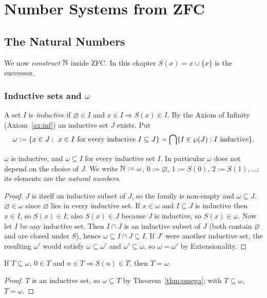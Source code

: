 \part{Number Systems from ZFC}

\chapter{The Natural Numbers}\label{ch:nat}

We now \emph{construct} $\mathbb{N}$ inside ZFC. In this chapter $S(x)=x\cup\{x\}$ is the successor.

\section{Inductive sets and $\omega$}

\begin{definition}
	A set $I$ is \emph{inductive} if $\varnothing\in I$ and $x\in I\Rightarrow S(x)\in I$. By the Axiom of Infinity (Axiom~\ref{ax:inf}) an inductive set $J$ exists. Put
	\[
	\omega:=\{x\in J:\ x\in I\text{ for every inductive }I\subseteq J\}=\bigcap\{I\in\wp(J):I\text{ inductive}\}.
	\]
\end{definition}

\begin{theorem}\label{thm:omega}
	$\omega$ is inductive, and $\omega\subseteq I$ for every inductive set $I$. In particular $\omega$ does not depend on the choice of $J$. We write $\mathbb{N}:=\omega$, $0:=\varnothing$, $1:=S(0)$, $2:=S(1),\dots$; its elements are the \emph{natural numbers}.
\end{theorem}
\begin{proof}
	$J$ is itself an inductive subset of $J$, so the family is non-empty and $\omega\subseteq J$. $\varnothing\in\omega$ since $\varnothing$ lies in every inductive set. If $x\in\omega$ and $I\subseteq J$ is inductive then $x\in I$, so $S(x)\in I$; also $S(x)\in J$ because $J$ is inductive, so $S(x)\in\omega$. Now let $I$ be any inductive set. Then $I\cap J$ is an inductive subset of $J$ (both contain $\varnothing$ and are closed under $S$), hence $\omega\subseteq I\cap J\subseteq I$. If $J'$ were another inductive set, the resulting $\omega'$ would satisfy $\omega\subseteq\omega'$ and $\omega'\subseteq\omega$, so $\omega=\omega'$ by Extensionality.
\end{proof}

\begin{theorem}\label{thm:induction}
	If $T\subseteq\omega$, $0\in T$ and $n\in T\Rightarrow S(n)\in T$, then $T=\omega$.
\end{theorem}
\begin{proof}
	$T$ is an inductive set, so $\omega\subseteq T$ by Theorem~\ref{thm:omega}; with $T\subseteq\omega$, $T=\omega$.
\end{proof}


